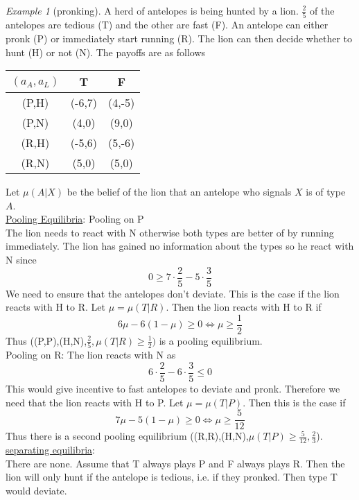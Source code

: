 \documentclass[a4paper, 12pt]{article}
\theoremstyle{plain}
\theoremstyle{definition}
\theoremstyle{lemma}
\theoremstyle{remark}
\theoremstyle{corollary}
\theoremstyle{example}
\newtheorem{example}[theorem]{Example}
\begin{document}
	\begin{example}[pronking]
		A herd of antelopes is being hunted by a lion. $\frac{2}{5}$ of the antelopes are tedious (T) and the other are fast (F). An antelope can either pronk (P) or immediately start running (R). The lion can then decide whether to hunt (H) or not (N). The payoffs are as follows 
		\begin{center}
			\begin{table}[h]
				\begin{tabular}{|c|c|c|}
					\hline
					$(a_A,a_L)$ & T & F\\
					\hline
					(P,H) & (-6,7) & (4,-5)\\
					\hline
					(P,N) & (4,0) & (9,0)\\
					\hline
					(R,H) & (-5,6) & (5,-6)\\
					\hline
					(R,N) & (5,0) & (5,0)\\
					\hline
				\end{tabular}
			\end{table}
		\end{center}
	Let $\mu(A|X)$ be the belief of the lion that an antelope who signals $X$ is of type $A$.\\
	\underline{Pooling Equilibria}: Pooling on P\\
	The lion needs to react with N otherwise both types are better of by running immediately. The lion has gained no information about the types so he react with N since \[0 \geq 7\cdot \frac{2}{5} - 5\cdot \frac{3}{5}\]
	We need to ensure that the antelopes don't deviate. This is the case if the lion reacts with H to R. Let $\mu = \mu(T|R)$. Then the lion reacts with H to R if \[6\mu - 6(1-\mu) \geq 0 \Leftrightarrow \mu \geq \frac{1}{2}\]
	Thus ((P,P),(H,N),$\frac{2}{5},\mu(T|R)\geq\frac{1}{2})$ is a pooling equilibrium.\\
	Pooling on R:
	The lion reacts with N as \[6\cdot \frac{2}{5} - 6\cdot \frac{3}{5} \leq 0\] This would give incentive to fast antelopes to deviate and pronk. Therefore we need that the lion reacts with H to P. Let $\mu = \mu(T|P)$. Then this is the case if \[7\mu - 5(1-\mu) \geq 0 \Leftrightarrow \mu \geq \frac{5}{12}\] Thus there is a second pooling equilibrium ((R,R),(H,N),$\mu(T|P)\geq \frac{5}{12},\frac{2}{3}$).\\
	\underline{separating equilibria}:\\
	There are none. Assume that T always plays P and F always plays R. Then the lion will only hunt if the antelope is tedious, i.e. if they pronked. Then type T would deviate.\\

\end{example}
\end{document}
